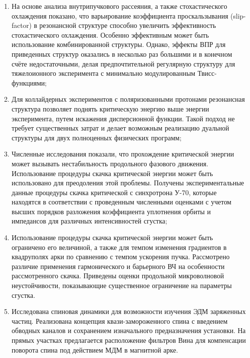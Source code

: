 \begin{enumerate}

  \item На основе анализа внутрипучкового рассеяния, а также стохастического охлаждения показано, что варьирование коэффициента проскальзывания (slip-factor) в резонансной структуре способно увеличить эффективность стохастического охлаждения. Особенно эффективным может быть использование комбинированной структуры. Однако, эффекты ВПР для приведенных структур оказались в несколько раз большими и в конечном счёте недостаточными, делая предпочтительной регулярную структуру для тяжелоионного эксперимента с минимально модулированным Твисс-функциями;
  
  \item Для коллайдерных экспериментов с поляризованными протонами резонансная структура позволяет поднять критическую энергию выше энергии эксперимента, путем искажения дисперсионной функции. Такой подход не требует существенных затрат и делает возможным реализацию дуальной структуры для двух полноценных физических программ;
  
  \item Численные исследования показали, что прохождение критической энергии может вызывать нестабильность продольного фазового движения. Использование процедуры скачка критической энергии может быть использовано для преодоления этой проблемы. Получены экспериментальные данные процедуры скачка критической с синхротрона У-70, которые находятся в соответствии с проведенным численными оценками с учетом высших порядков разложения коэффициента уплотнения орбиты и импедансов для различных интенсивностей сгустка;
  
  \item Использование процедуры скачка критической энергии может быть ограничено его величиной, а также для темпом изменения градиентов в квадруполях арки по сравнению с темпом ускорения пучка. Рассмотрено различие применения гармонического и барьерного ВЧ на особенности рассмотренного скачка. Приведены оценки продольной микроволновой неустойчивости, показывающие существенное ограничение на параметры сгустка.
  
  \item Исследована спиновая динамики для возможности изучения ЭДМ заряженных частиц. Реализована концепция квази-замороженного спина с введением обводных каналов и сохранением изначального предназначения установки. На прямых участках предлагается расположение фильтров Вина для компенсации поворота спина под действием МДМ в магнитной арке.
  

\end{enumerate}

